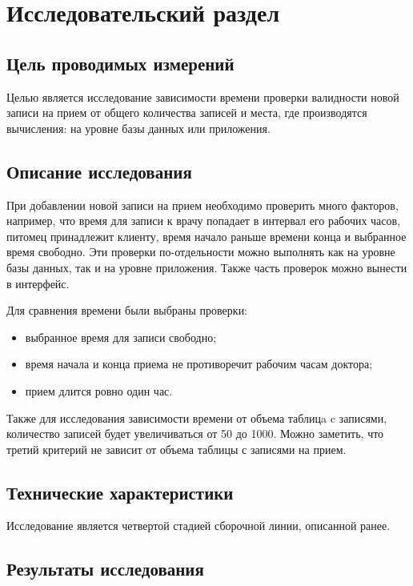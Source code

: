 \section{Исследовательский раздел}


\subsection{Цель проводимых измерений}

Целью является исследование зависимости времени проверки валидности новой записи на прием от общего количества записей и места, где производятся вычисления: на уровне базы данных или приложения.

\subsection{Описание исследования}

При добавлении новой записи на прием необходимо проверить много факторов, например, что время для записи к врачу попадает в интервал его рабочих часов, питомец принадлежит клиенту, время начало раньше времени конца и выбранное время свободно. Эти проверки по-отдельности можно выполнять как на уровне базы данных, так и на уровне приложения. Также часть проверок можно вынести в интерфейс.

Для сравнения времени были выбраны проверки:
\begin{itemize}[label*=---]
	\item выбранное время для записи свободно;
	\item время начала и конца приема не противоречит рабочим часам доктора;
	\item прием длится ровно один час.
\end{itemize}

Также для исследования зависимости времени от объема таблицa c записями, количество записей будет увеличиваться от 50 до 1000. Можно заметить, что третий критерий не зависит от объема таблицы с записями на прием.

\subsection{Технические характеристики}

Исследование является четвертой стадией сборочной линии, описанной ранее. 


\subsection{Результаты исследования}
